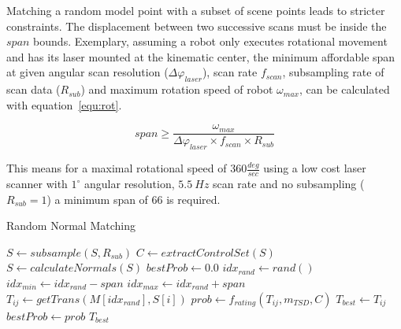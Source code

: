 \documentclass[conference]{IEEEtran}
\begin{document}
Matching a random model point with a subset of scene points leads to stricter constraints. The displacement between two successive scans must be inside the $span$ bounds. Exemplary, assuming a robot only executes rotational movement and has its laser mounted at the kinematic center, the minimum affordable span at given angular scan resolution ($\Delta\varphi_{laser}$), scan rate $f_{scan}$, subsampling rate of scan data ($R_{sub}$) and maximum rotation speed of robot $\omega_{max}$, can be calculated with equation~\ref{equ:rot}.

\begin{equation}
\label{equ:rot}
span \geq \frac{\omega_{max}}{\Delta\varphi_{laser} \times f_{scan} \times R_{sub}}
\end{equation}

This means for a maximal rotational speed of $360 \frac{deg}{sec}$ using a low cost laser scanner  with $1^\circ$ angular resolution, $5.5~Hz$ scan rate and no subsampling ($R_{sub} = 1$) a minimum span of 66 is required. 


\begin{algorithm}
	\caption{Random Normal Matching}
	\label{alg:rnm}
	\begin{algorithmic}[1]
		\State $S \gets subsample(S, R_{sub})$
		\State $C \gets extractControlSet(S)$
		\State $S \gets calculateNormals(S)$
		\State $bestProb \gets 0.0$
		\State $idx_{rand} \gets rand()$
		\State $idx_{min} \gets idx_{rand} - span$
		\State $idx_{max} \gets idx_{rand} + span$
		\State $T_{ij} \gets getTrans\left(M[idx_{rand}], S[i]\right)$
		\State $prob \gets f_{rating}\left(T_{ij},m_{TSD}, C\right)$
		\State $T_{best} \gets T_{ij}$
		\State $bestProb \gets prob$
		\EndIf
		\EndFor
		\EndFor
		\State \Return $T_{best}$
		\EndFunction
	\end{algorithmic}
\end{algorithm}
\end{document}
